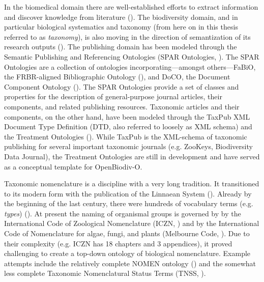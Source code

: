 In the biomedical domain there are well-established efforts to extract information and discover knowledge from literature (\cite{momtchev_expanding_2009, williams_open_2012, rebholz-schuhmann_facts_2005}). The biodiversity domain, and in particular biological systematics and taxonomy (from here on in this thesis referred to as \emph{taxonomy}), is also moving in the direction of semantization of its research outputs (\cite{kennedy_scientific_2005,penev_fast_2010, tzitzikas_integrating_2013}). The publishing domain has been modeled through the Semantic Publishing and Referencing Ontologies (SPAR Ontologies, \cite{peroni_semantic_2014}). The SPAR Ontologies are a collection of ontologies incorporating---amongst others---FaBiO, the FRBR-aligned Bibliographic Ontology (\cite{peroni_fabio_2012}), and DoCO, the Document Component Ontology (\cite{constantin_document_2016}). The SPAR Ontologies provide a set of classes and properties for the description of general-purpose journal articles, their components, and related publishing resources. Taxonomic articles and their components, on the other hand, have been modeled through the TaxPub XML Document Type Definition (DTD, also referred to loosely as XML schema) and the Treatment Ontologies (\cite{catapano_taxpub:_2010,catapano_treatment_2016}). While TaxPub is the XML-schema of taxonomic publishing for several important taxonomic journals (e.g. ZooKeys, Biodiversity Data Journal), the Treatment Ontologies are still in development and have served as a conceptual template for OpenBiodiv-O.

Taxonomic nomenclature is a discipline with a very long tradition. It transitioned to its modern form with the publication of the Linnaean System (\cite{linnaeus_systema_1758}). Already by the beginning of the last century, there were hundreds of vocabulary terms (e.g. \emph{types}) (\cite{witteveen_naming_2015}). At present the naming of organismal groups is governed by by the International Code of Zoological Nomenclature (ICZN, \cite{international_commission_on_zoological_nomenclature_international_1999}) and by the International Code of Nomenclature for algae, fungi, and plants (Melbourne Code, \cite{mcneill_international_2012}). Due to their complexity (e.g. ICZN has 18 chapters and 3 appendices), it proved challenging to create a top-down ontology of biological nomenclature. Example attempts include the relatively complete NOMEN ontology (\cite{dmitriev_nomen_2017}) and the somewhat less complete Taxonomic Nomenclatural Status Terms (TNSS, \cite{morris_taxonomic_nodate}).


